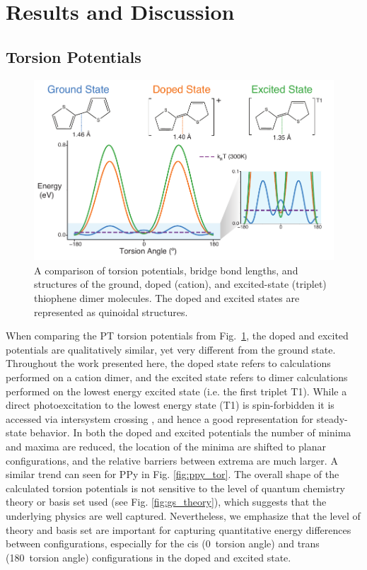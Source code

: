 \section{Results and Discussion}
\subsection{Torsion Potentials}

\begin{figure}[hbt!]
    \centering
    \includegraphics{figures/chap2/tor_compare.pdf}
    \caption[Comparison of the Ground, Doped, and Excited-state Torsion Potentials]{A comparison of torsion potentials, bridge bond lengths, and structures of the ground, doped (cation), and excited-state (triplet) thiophene dimer molecules. The doped and excited states are represented as quinoidal structures.}
    \label{fig:comp_tor}
\end{figure}

When comparing the PT torsion potentials from Fig.~\ref{fig:comp_tor}, the doped and excited potentials are qualitatively similar, yet very different from the ground state. Throughout the work presented here, the doped state refers to calculations performed on a cation dimer, and the excited state refers to dimer calculations performed on the lowest energy excited state (i.e. the first triplet T1). While a direct photoexcitation to the lowest energy state (T1) is spin-forbidden it is accessed via intersystem crossing \cite{Beljonne2001, Banerji2011, Kolle2016}, and hence a good representation for steady-state behavior. In both the doped and excited potentials the number of minima and maxima are reduced, the location of the minima are shifted to planar configurations, and the relative barriers between extrema are much larger. A similar trend can seen for PPy in Fig. \ref{fig:ppy_tor}. The overall shape of the calculated torsion potentials is not sensitive to the level of quantum chemistry theory or basis set used (see Fig. \ref{fig:gs_theory}), which suggests that the underlying physics are well captured. Nevertheless, we emphasize that the level of theory and basis set are important for capturing quantitative energy differences between configurations, especially for the cis (0\textdegree \ torsion angle) and trans (180\textdegree \ torsion angle) configurations in the doped and excited state.

